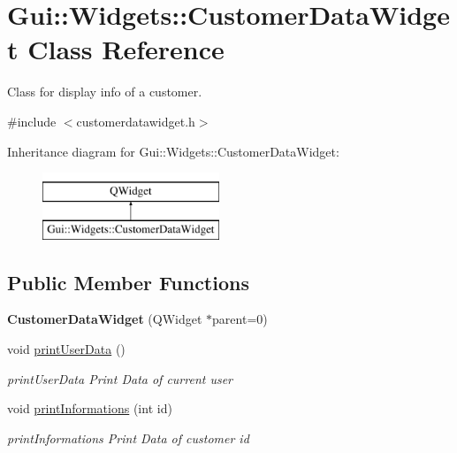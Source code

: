 \hypertarget{classGui_1_1Widgets_1_1CustomerDataWidget}{\section{Gui\+:\+:Widgets\+:\+:Customer\+Data\+Widget Class Reference}
\label{classGui_1_1Widgets_1_1CustomerDataWidget}
}


Class for display info of a customer.  




{\ttfamily \#include $<$customerdatawidget.\+h$>$}

Inheritance diagram for Gui\+:\+:Widgets\+:\+:Customer\+Data\+Widget\+:\begin{figure}[H]
\begin{center}
\leavevmode
\includegraphics[height=2.000000cm]{df/deb/classGui_1_1Widgets_1_1CustomerDataWidget}
\end{center}
\end{figure}
\subsection*{Public Member Functions}
\begin{DoxyCompactItemize}
\item 
\hypertarget{classGui_1_1Widgets_1_1CustomerDataWidget_a649d25216952fa8642b22983a07c9186}{{\bfseries Customer\+Data\+Widget} (Q\+Widget $\ast$parent=0)}\label{classGui_1_1Widgets_1_1CustomerDataWidget_a649d25216952fa8642b22983a07c9186}

\item 
\hypertarget{classGui_1_1Widgets_1_1CustomerDataWidget_a78504b749fc7d80302c27748a4033b1f}{void \hyperlink{classGui_1_1Widgets_1_1CustomerDataWidget_a78504b749fc7d80302c27748a4033b1f}{print\+User\+Data} ()}\label{classGui_1_1Widgets_1_1CustomerDataWidget_a78504b749fc7d80302c27748a4033b1f}

\begin{DoxyCompactList}\small\item\em print\+User\+Data Print Data of current user \end{DoxyCompactList}\item 
void \hyperlink{classGui_1_1Widgets_1_1CustomerDataWidget_aa995ed95c5ca119db4258af2fe403691}{print\+Informations} (int id)
\begin{DoxyCompactList}\small\item\em print\+Informations Print Data of customer id \end{DoxyCompactList}\end{DoxyCompactItemize}


